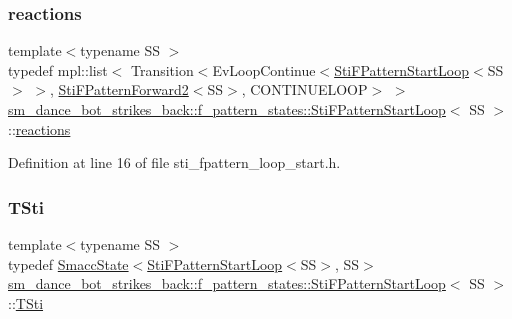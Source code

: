 \subsubsection{\texorpdfstring{reactions}{reactions}}
{\footnotesize\ttfamily template$<$typename SS $>$ \\
typedef mpl\+::list$<$ Transition$<$Ev\+Loop\+Continue$<$\hyperlink{structsm__dance__bot__strikes__back_1_1f__pattern__states_1_1StiFPatternStartLoop}{Sti\+F\+Pattern\+Start\+Loop}$<$SS$>$ $>$, \hyperlink{structsm__dance__bot__strikes__back_1_1f__pattern__states_1_1StiFPatternForward2}{Sti\+F\+Pattern\+Forward2}$<$SS$>$, C\+O\+N\+T\+I\+N\+U\+E\+L\+O\+OP$>$ $>$ \hyperlink{structsm__dance__bot__strikes__back_1_1f__pattern__states_1_1StiFPatternStartLoop}{sm\+\_\+dance\+\_\+bot\+\_\+strikes\+\_\+back\+::f\+\_\+pattern\+\_\+states\+::\+Sti\+F\+Pattern\+Start\+Loop}$<$ SS $>$\+::\hyperlink{structsm__dance__bot__strikes__back_1_1f__pattern__states_1_1StiFPatternStartLoop_a2f2035f8c31ad2fb1e29711013ce79fa}{reactions}}



Definition at line 16 of file sti\+\_\+fpattern\+\_\+loop\+\_\+start.\+h.

\mbox{\label{structsm__dance__bot__strikes__back_1_1f__pattern__states_1_1StiFPatternStartLoop_a3c1089e9485fca72295426898cb9e3d8}} 
\subsubsection{\texorpdfstring{T\+Sti}{TSti}}
{\footnotesize\ttfamily template$<$typename SS $>$ \\
typedef \hyperlink{classSmaccState}{Smacc\+State}$<$\hyperlink{structsm__dance__bot__strikes__back_1_1f__pattern__states_1_1StiFPatternStartLoop}{Sti\+F\+Pattern\+Start\+Loop}$<$SS$>$, SS$>$ \hyperlink{structsm__dance__bot__strikes__back_1_1f__pattern__states_1_1StiFPatternStartLoop}{sm\+\_\+dance\+\_\+bot\+\_\+strikes\+\_\+back\+::f\+\_\+pattern\+\_\+states\+::\+Sti\+F\+Pattern\+Start\+Loop}$<$ SS $>$\+::\hyperlink{structsm__dance__bot__strikes__back_1_1f__pattern__states_1_1StiFPatternStartLoop_a3c1089e9485fca72295426898cb9e3d8}{T\+Sti}}



